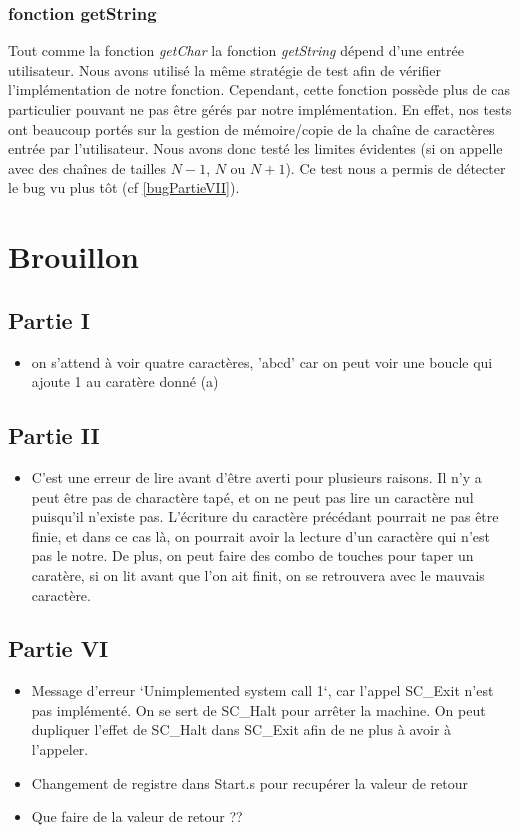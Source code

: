 \documentclass{article}
\begin{document}
    \subsubsection{fonction getString} 
    Tout comme la fonction \textit{getChar} la fonction \textit{getString} dépend d'une entrée utilisateur. Nous avons utilisé la même stratégie
    de test afin de vérifier l'implémentation de notre fonction. Cependant, cette fonction possède plus de cas particulier pouvant ne pas être gérés par notre implémentation.
    En effet, nos tests ont beaucoup portés sur la gestion de mémoire/copie de la chaîne de caractères entrée par l'utilisateur. Nous avons donc testé les limites évidentes
    (si on appelle avec des chaînes de tailles $N-1$, $N$ ou $N+1$). Ce test nous a permis de détecter le bug vu plus tôt (cf \ref{bugPartieVII}).
\section{Brouillon}
\subsection{Partie I}
\begin{itemize}
    \item on s'attend à voir quatre caractères, 'abcd' car on peut voir une boucle qui ajoute 1 au caratère donné (a)

    
\end{itemize}

\subsection{Partie II}
\begin{itemize}
    \item C'est une erreur de lire avant d'être averti pour plusieurs raisons. Il n'y a peut être pas de charactère tapé, et on ne peut pas lire un caractère nul puisqu'il n'existe pas.
    L'écriture du caractère précédant pourrait ne pas être finie, et dans ce cas là, on pourrait avoir la lecture d'un caractère qui n'est pas le notre.
    De plus, on peut faire des combo de touches pour taper un caratère, si on lit avant que l'on ait finit, on se retrouvera avec le mauvais caractère.

    
\end{itemize}


\subsection{Partie VI}
\begin{itemize}
    \item Message d'erreur `Unimplemented system call 1`, car l'appel SC\_Exit n'est pas implémenté. On se sert de SC\_Halt pour arrêter la machine.
    On peut dupliquer l'effet de SC\_Halt dans SC\_Exit afin de ne plus à avoir à l'appeler.
    \item Changement de registre dans Start.s pour recupérer la valeur de retour
    \item Que faire de la valeur de retour ??
\end{itemize}
\end{document}
